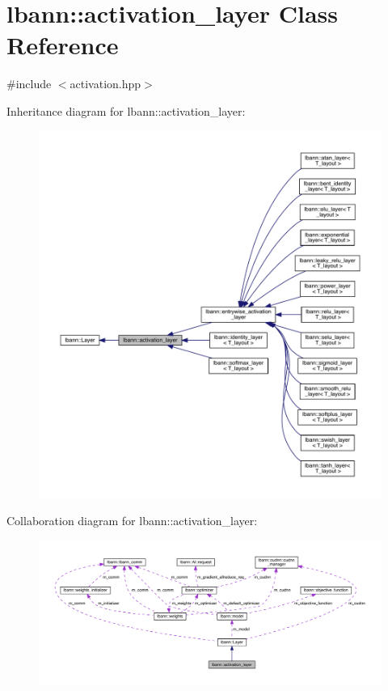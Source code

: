 \hypertarget{classlbann_1_1activation__layer}{}\section{lbann\+:\+:activation\+\_\+layer Class Reference}
\label{classlbann_1_1activation__layer}


{\ttfamily \#include $<$activation.\+hpp$>$}



Inheritance diagram for lbann\+:\+:activation\+\_\+layer\+:\nopagebreak
\begin{figure}[H]
\begin{center}
\leavevmode
\includegraphics[width=350pt]{classlbann_1_1activation__layer__inherit__graph}
\end{center}
\end{figure}


Collaboration diagram for lbann\+:\+:activation\+\_\+layer\+:\nopagebreak
\begin{figure}[H]
\begin{center}
\leavevmode
\includegraphics[width=350pt]{classlbann_1_1activation__layer__coll__graph}
\end{center}
\end{figure}
